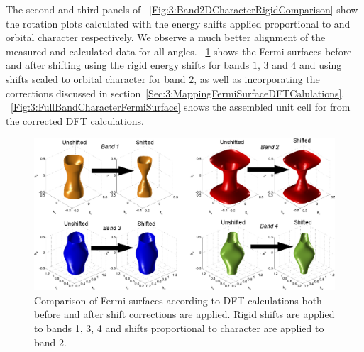 The second and third panels of \fig~\ref{Fig:3:Band2DCharacterRigidComparison} show the rotation plots calculated with the energy shifts applied proportional to \DzTwo and \DxzDyz orbital character respectively. We observe a much better alignment of the measured and calculated data for all angles. \Fig~\ref{Fig:3:BandCharacterFSShiftComparison} shows the Fermi surfaces before and after shifting using the rigid energy shifts for bands $1$, $3$ and $4$ and using shifts scaled to \DzTwo orbital character for band $2$, as well as incorporating the corrections discussed in section~\ref{Sec:3:MappingFermiSurfaceDFTCalulations}. \Fig~\ref{Fig:3:FullBandCharacterFermiSurface} shows the assembled unit cell for \BaFeP from the corrected DFT calculations. 
\begin{figure}[htbp]
    \begin{center}
        \includegraphics[scale=0.7]{Chapter3-dHvABaFe2P2/Figures/AngleDepMeasurements/BandCharacterFermiSurface/BandCharacterFermiSurfaceShiftComparison}
        \caption{Comparison of Fermi surfaces according to DFT calculations both before and after shift corrections are applied. Rigid shifts are applied to bands 1, 3, 4 and shifts proportional to \DzTwo character are applied to band 2.}
        \label{Fig:3:BandCharacterFSShiftComparison}
    \end{center}
\end{figure}
